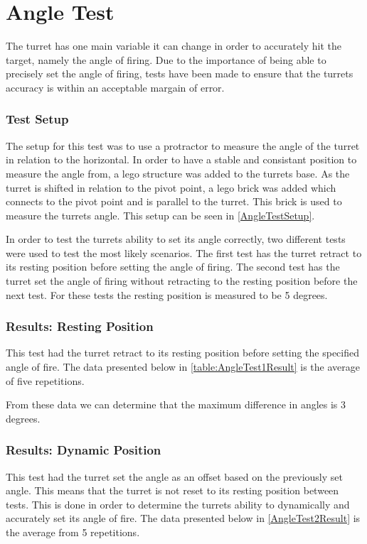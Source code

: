 \chapter{Angle Test}\label{angleTest}
The turret has one main variable it can change in order to accurately hit the
target, namely the angle of firing. Due to the importance of being able to
precisely set the angle of firing, tests have been made to ensure that the
turrets accuracy is within an acceptable margain of error.

\subsection{Test Setup}
The setup for this test was to use a protractor to measure the angle of the
turret in relation to the horizontal. In order to have a stable and
consistant position to measure the angle from, a lego structure was added to the
turrets base. As the turret is shifted in relation to the pivot point, a lego
brick was added which connects to the pivot point and is parallel to the turret.
This brick is used to measure the turrets angle. This setup can be seen in
\autoref{AngleTestSetup}.


In order to test the turrets ability to set its angle correctly, two different
tests were used to test the most likely scenarios. The first test has the turret
retract to its resting position before setting the angle of firing. The second
test has the turret set the angle of firing without retracting to the resting
position before the next test. For these tests the resting position is measured
to be 5 degrees.

\subsection{Results: Resting Position}
This test had the turret retract to its resting position before setting the
specified angle of fire. The data presented below in
\autoref{table:AngleTest1Result} is the average of five repetitions.


From these data we can determine that the maximum difference in angles is 3
degrees.  

\subsection{Results: Dynamic Position}
This test had the turret set the angle as an offset based on the previously set
angle. This means that the turret is not reset to its resting position between
tests. This is done in order to determine the turrets ability to dynamically and
accurately set its angle of fire. The data presented below in
\autoref{AngleTest2Result} is the average from 5 repetitions.

